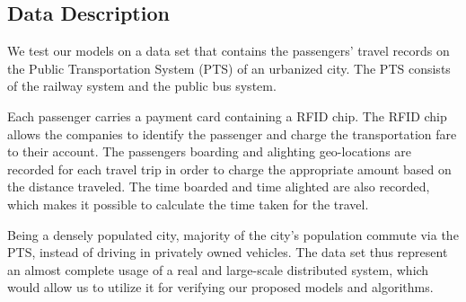 \documentclass[conference]{IEEEtran.1.8}
\begin{document}
\subsection{Data Description}

We test our models on a data set that contains the passengers' travel records on the Public Transportation System (PTS) of an urbanized city. The PTS consists of the railway system and the public bus system.


Each passenger carries a payment card containing a RFID chip. The RFID chip allows the companies to identify the passenger and charge the transportation fare to their account. The passengers boarding and alighting geo-locations are recorded for each travel trip in order to charge the appropriate amount based on the distance traveled. The time boarded and time alighted are also recorded, which makes it possible to calculate the time taken for the travel.

Being a densely populated city, majority of the city's population commute via the PTS, instead of driving in privately owned vehicles. The data set thus represent an almost complete usage of a real and large-scale distributed system, which would allow us to utilize it for verifying our proposed models and algorithms.
\end{document}
